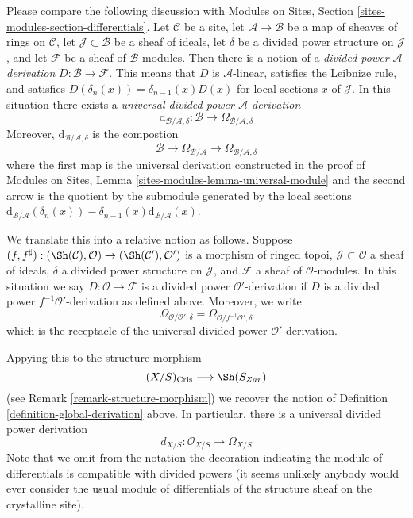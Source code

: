 \medskip\noindent
Please compare the following discussion with
Modules on Sites, Section \ref{sites-modules-section-differentials}. Let
$\mathcal{C}$ be a site, let $\mathcal{A} \to \mathcal{B}$ be a
map of sheaves of rings on $\mathcal{C}$, let $\mathcal{J} \subset \mathcal{B}$
be a sheaf of ideals, let $\delta$ be a divided power structure on
$\mathcal{J}$, and let $\mathcal{F}$ be a sheaf of $\mathcal{B}$-modules.
Then there is a notion of a {\it divided power $\mathcal{A}$-derivation}
$D : \mathcal{B} \to \mathcal{F}$. This means that $D$ is $\mathcal{A}$-linear,
satisfies the Leibnize rule, and satisfies
$D(\delta_n(x)) = \delta_{n - 1}(x)D(x)$ for local sections $x$ of
$\mathcal{J}$. In this situation there exists a
{\it universal divided power $\mathcal{A}$-derivation}
$$
\text{d}_{\mathcal{B}/\mathcal{A}, \delta} :
\mathcal{B}
\longrightarrow
\Omega_{\mathcal{B}/\mathcal{A}, \delta}
$$
Moreover, $\text{d}_{\mathcal{B}/\mathcal{A}, \delta}$ is the compostion
$$
\mathcal{B}
\longrightarrow
\Omega_{\mathcal{B}/\mathcal{A}}
\longrightarrow
\Omega_{\mathcal{B}/\mathcal{A}, \delta}
$$
where the first map is the universal derivation constructed in the proof
of Modules on Sites, Lemma \ref{sites-modules-lemma-universal-module}
and the second arrow is the quotient by the submodule generated by
the local sections
$\text{d}_{\mathcal{B}/\mathcal{A}}(\delta_n(x)) -
\delta_{n - 1}(x)\text{d}_{\mathcal{B}/\mathcal{A}}(x)$.

\medskip\noindent
We translate this into a relative notion as follows. Suppose
$(f, f^\sharp) : (\Sh(\mathcal{C}), \mathcal{O}) \to
(\Sh(\mathcal{C}'), \mathcal{O}')$ is a morphism of ringed topoi,
$\mathcal{J} \subset \mathcal{O}$ a sheaf of ideals, $\delta$ a
divided power structure on $\mathcal{J}$, and $\mathcal{F}$ a sheaf
of $\mathcal{O}$-modules. In this situation we say
$D : \mathcal{O} \to \mathcal{F}$ is a divided power $\mathcal{O}'$-derivation
if $D$ is a divided power $f^{-1}\mathcal{O}'$-derivation as defined above.
Moreover, we write
$$
\Omega_{\mathcal{O}/\mathcal{O}', \delta} =
\Omega_{\mathcal{O}/f^{-1}\mathcal{O}', \delta}
$$
which is the receptacle of the universal divided power
$\mathcal{O}'$-derivation.

\medskip\noindent
Appying this to the structure morphism
$$
(X/S)_{\text{Cris}} \longrightarrow \Sh(S_{Zar})
$$
(see Remark \ref{remark-structure-morphism}) we recover the notion of
Definition \ref{definition-global-derivation} above.
In particular, there is a universal divided power derivation
$$
d_{X/S} : \mathcal{O}_{X/S} \to \Omega_{X/S}
$$
Note that we omit from the notation the decoration indicating the
module of differentials is compatible with divided powers (it seems
unlikely anybody would ever consider the usual module of differentials
of the structure sheaf on the crystalline site).

